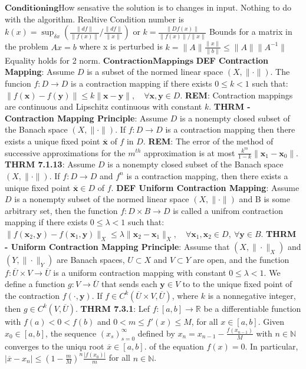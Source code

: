 \documentclass{article}
\theoremstyle{definition}
\begin{document}
$\mathbf{Conditioning}$How sensative the solution is to changes in input. Nothing to do with the algorithm.
Realtive Condition number is $k(x) = \sup_{\delta x}(\frac{\|df\|}{\|f(x)\|} \big/ \frac{\|df\|}{\|x\|})$ or $k = \frac{\|Df(x)\|}{\|f(x)\|/\|x\|}$
Bounds for a matrix in the problem $Ax = b$ where x is perturbed is $k = \|A\|\frac{\|x\|}{\|b\|} \leq \|A\|\|A^{-1}\|$ Equality holds for 2 norm.
$\mathbf{Contraction Mappings}$
\textbf{DEF Contraction Mapping}: Assume $D$ is a subset of the normed linear space $(X, \| \cdot \| )$. The funcion $f:D \rightarrow D$ is a contraction mapping if there exists $0 \leq k < 1$ such that: $\| f(\textbf{x}) - f(\textbf{y}) \| \leq k \| \textbf{x} - \textbf{y} \|, \quad \forall \textbf{x},\textbf{y} \in D$. 
\textbf{REM}: Contraction mappings are continuous and Lipschitz continuous with constant $k$. 
\textbf{THRM - Contraction Mapping Principle}: Assume $D$ is a nonempty closed subset of the Banach space $(X, \| \cdot \| )$. If $f:D \rightarrow D$ is a contraction mapping then there exists a unique fixed point $\overline{\textbf{x}}$ of $f$ in $D$. 
\textbf{REM}: The error of the method of successive approximations for the $m^{th}$ approximation is at most $\frac{k^m}{1-k} \| \textbf{x}_1 - \textbf{x}_0 \|$.
\textbf{THRM 7.1.13}: Assume $D$ is a nonempty closed subset of the Banach space $(X, \| \cdot \| )$. If $f:D \rightarrow D$ and $f^n$ is a contraction mapping, then there exists a unique fixed point $\overline{\textbf{x}} \in D$ of $f$. 
\textbf{DEF Uniform Contraction Mapping}: Assume $D$ is a nonempty subset of the normed linear space $(X, \| \cdot \| )$ and B is some arbitrary set, then the function $f:D \times B \rightarrow D$ is called a unifrom contraction mapping if there exists $0 \leq \lambda < 1$ such that: $\| f(\textbf{x}_2, \textbf{y}) - f(\textbf{x}_1, \textbf{y})  \|_X \leq \lambda \| \textbf{x}_2 - \textbf{x}_1 \|_X, \quad \forall \textbf{x}_1, \textbf{x}_2 \in D,~ \forall \textbf{y} \in B$. 
\textbf{THRM - Uniform Contraction Mapping Principle}: Assume that $(X, \| \cdot \|_X )$ and $(Y, \| \cdot \|_Y )$ are Banach spaces, $U\subset X$ and $V \subset Y$ are open, and the function $f:\overline U \times V \rightarrow \overline U$ is a uniform contraction mapping with constant $ 0 \leq \lambda < 1$. We define a function $g:V \rightarrow \overline U$ that sends each $\textbf{y} \in V$ to to the unique fixed point of the contraction $f(\cdot, \textbf{y})$. If $f \in C^k(\overline U \times V, \overline U)$, where $k$ is a nonnegative integer, then $g \in C^k(V,\overline U)$. 
\textbf{THRM 7.3.1}: Lef $f:[a,b] \rightarrow \mathbb{R}$ be a differentiable function with $f(a) < 0 < f(b)$ and $0 < m \leq f'(x) \leq M$, for all $x \in [a,b]$. Given $x_0 \in [a,b]$, the sequence $(x_s)_{s=0}^{\infty}$ defined by $x_n = x_{n-1} - \frac{f(x_{n-1})}{M}$ with $n\in \mathbb{N}$ converges to the uniqu root $\overline{x} \in [a,b]$. of the equation $f(x) = 0$. In particular, $|\overline{x} - x_n| \leq \left(1-\frac{m}{M}\right)^n \frac{|f(x_0)|}{m}$ for all $n \in \mathbb{N}$.
\end{document}
